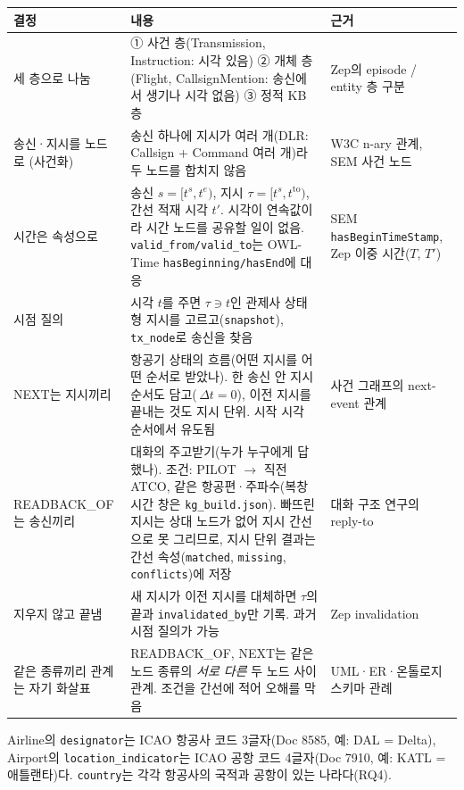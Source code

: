 \documentclass[10pt,a4paper]{article}
\begin{document}
\begin{center}\footnotesize
\begin{tabularx}{\textwidth}{@{}>{\raggedright\arraybackslash}p{3.0cm}>{\raggedright\arraybackslash}X>{\raggedright\arraybackslash}p{3.6cm}@{}}
\toprule
결정 & 내용 & 근거\\\midrule
세 층으로 나눔 & ① 사건 층(Transmission, Instruction: 시각 있음) ② 개체 층(Flight, CallsignMention: 송신에서 생기나 시각 없음) ③ 정적 KB 층 & Zep의 episode / entity 층 구분\\
송신·지시를 노드로 (사건화) & 송신 하나에 지시가 여러 개(DLR: Callsign + Command 여러 개)라 두 노드를 합치지 않음 & W3C n-ary 관계, SEM 사건 노드\\
시간은 속성으로 & 송신 $s=[t^s,t^e)$, 지시 $\tau=[t^s,t^{\mathrm{to}})$, 간선 적재 시각 $t'$. 시각이 연속값이라 시간 노드를 공유할 일이 없음. \texttt{valid\_from/valid\_to}는 OWL-Time \texttt{hasBeginning/hasEnd}에 대응 & SEM \texttt{hasBeginTimeStamp}, Zep 이중 시간($T$, $T'$)\\
시점 질의 & 시각 $t$를 주면 $\tau\ni t$인 관제사 상태형 지시를 고르고(\texttt{snapshot}), \texttt{tx\_node}로 송신을 찾음 & \\
NEXT는 지시끼리 & 항공기 상태의 흐름(어떤 지시를 어떤 순서로 받았나). 한 송신 안 지시 순서도 담고(\,$\Delta t=0$), 이전 지시를 끝내는 것도 지시 단위. 시작 시각 순서에서 유도됨 & 사건 그래프의 next-event 관계\\
READBACK\_OF는 송신끼리 & 대화의 주고받기(누가 누구에게 답했나). 조건: PILOT $\to$ 직전 ATCO, 같은 항공편·주파수(복창 시간 창은 \texttt{kg\_build.json}). 빠뜨린 지시는 상대 노드가 없어 지시 간선으로 못 그리므로, 지시 단위 결과는 간선 속성(\texttt{matched}, \texttt{missing}, \texttt{conflicts})에 저장 & 대화 구조 연구의 reply-to\\
지우지 않고 끝냄 & 새 지시가 이전 지시를 대체하면 $\tau$의 끝과 \texttt{invalidated\_by}만 기록. 과거 시점 질의가 가능 & Zep invalidation\\
같은 종류끼리 관계는 자기 화살표 & READBACK\_OF, NEXT는 같은 노드 종류의 \emph{서로 다른} 두 노드 사이 관계. 조건을 간선에 적어 오해를 막음 & UML·ER·온톨로지 스키마 관례\\
\bottomrule
\end{tabularx}
\end{center}
{\footnotesize Airline의 \texttt{designator}는 ICAO 항공사 코드 3글자(Doc 8585, 예: DAL = Delta), Airport의 \texttt{location\_indicator}는 ICAO 공항 코드 4글자(Doc 7910, 예: KATL = 애틀랜타)다. \texttt{country}는 각각 항공사의 국적과 공항이 있는 나라다(RQ4).}
\end{document}
